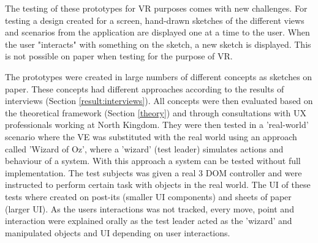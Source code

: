 The testing of these prototypes for VR purposes comes with new challenges. For testing a design created for a screen, hand-drawn sketches of the different views and scenarios from the application are displayed one at a time to the user. When the user "interacts" with something on the sketch, a new sketch is displayed\cite{proto:boling1997holistic}. This is not possible on paper when testing for the purpose of VR.

The prototypes were created in large numbers of different concepts as sketches on paper. These concepts had different approaches according to the results of interviews (Section \ref{result:interviews}). All concepts were then evaluated based on the theoretical framework (Section \ref{theory}) and through consultations with UX professionals working at North Kingdom. They were then tested in a 'real-world' scenario where the VE was substituted with the real world using an approach called 'Wizard of Oz', where a 'wizard' (test leader) simulates actions and behaviour of a system\cite{proto:landauer1987psychology}. With this approach a system can be tested without full implementation. The test subjects was given a real 3 DOM controller and were instructed to perform certain task with objects in the real world. The UI of these tests where created on post-its (smaller UI components) and sheets of paper (larger UI). As the users interactions was not tracked, every move, point and interaction were explained orally as the test leader acted as the 'wizard' and manipulated objects and UI depending on user interactions.
